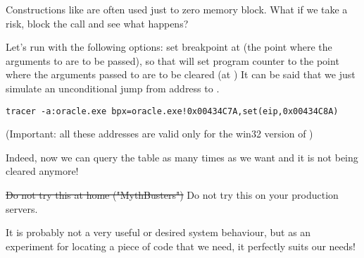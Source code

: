 Constructions like  are often used just to zero memory block.
What if we take a risk, block the  call and see what happens?


Let's run \tracer with the following options: set breakpoint at  
(the point where the arguments to  are to be passed), 
so that \tracer will set program counter  to the point where the arguments passed to  are to be cleared (at )
It can be said that we just simulate an unconditional jump from address  to .

\begin{lstlisting}
tracer -a:oracle.exe bpx=oracle.exe!0x00434C7A,set(eip,0x00434C8A)
\end{lstlisting}

(Important: all these addresses are valid only for the win32 version of )

Indeed, now we can query the  table as many times as we want and it is not being cleared anymore!

\sout{Do not try this at home ("MythBusters")} Do not try this on your production servers.

It is probably not a very useful or desired system behaviour, but as an experiment for locating a piece of code that we need, it perfectly suits our needs!

